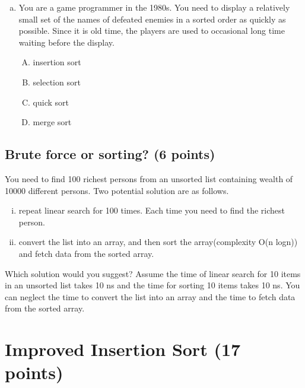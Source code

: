 \documentclass[11pt]{exam}
\begin{document}
\begin{enumerate}[(a)]
    \item You are a game programmer in the 1980s. You need to display a relatively small set of the names of defeated enemies in a sorted order as quickly as possible. Since it is old time, the players are used to occasional long time waiting before the display. 
    \begin{enumerate}[A)]
        \item insertion sort
        \item selection sort
        \item quick sort
        \item merge sort
    \end{enumerate}
    \begin{solution}
        
    \end{solution}
\end{enumerate}

\subsection{Brute force or sorting? (6 points)}
You need to find 100 richest persons from an unsorted list containing wealth of 10000 different persons. Two potential solution are as follows.
\begin{enumerate}[i)]
    \item repeat linear search for 100 times. Each time you need to find the richest person.
    \item convert the list into an array, and then sort the array(complexity O(n logn)) and fetch data from the sorted array.
\end{enumerate}
Which solution would you suggest? Assume the time of linear search for 10 items in an unsorted list takes 10 ns and the time for sorting 10 items takes 10 ns. You can neglect the time to convert the list into an array and the time to fetch data from the sorted array.

\begin{solution}
\end{solution}

\section{Improved Insertion Sort (17 points)}
\end{document}

